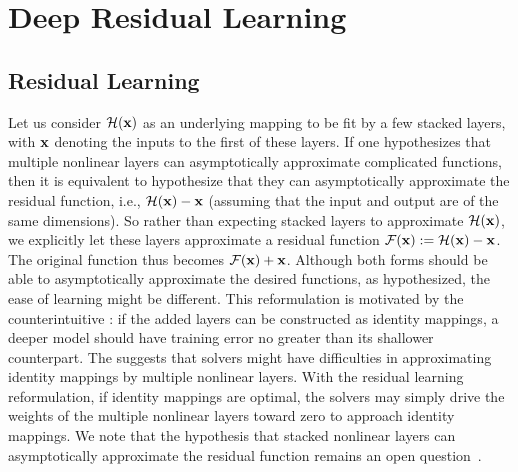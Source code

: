 \section{Deep Residual Learning}
\label{sec:method}

\subsection{Residual Learning}
\label{sec:residual}
Let us consider $\mathcal{H}(\mathbf{x})$ as an underlying mapping to be fit by a few
stacked layers, with $\mathbf{x}$ denoting the inputs to the first of these
layers. If one hypothesizes that multiple nonlinear layers can asymptotically
approximate complicated functions, then it is equivalent to hypothesize that
they can asymptotically approximate the residual function, i.e.,
$\mathcal{H}(\mathbf{x}) - \mathbf{x}$ (assuming that the input and output are of the same
dimensions). So rather than expecting stacked layers to approximate
$\mathcal{H}(\mathbf{x})$, we explicitly let these layers approximate a residual function
$\mathcal{F}(\mathbf{x}) := \mathcal{H}(\mathbf{x}) - \mathbf{x}$. The original function thus becomes
$\mathcal{F}(\mathbf{x}) + \mathbf{x}$. Although both forms should be able to asymptotically
approximate the desired functions, as hypothesized, the ease of learning might
be different. This reformulation is motivated by the counterintuitive
\degrad{}: if the added layers can be constructed as identity mappings, a deeper
model should have training error no greater than its shallower counterpart. The
\degrad{} suggests that solvers might have difficulties in approximating
identity mappings by multiple nonlinear layers. With the residual learning
reformulation, if identity mappings are optimal, the solvers may simply drive
the weights of the multiple nonlinear layers toward zero to approach identity
mappings. We note that the hypothesis that stacked nonlinear layers can
asymptotically approximate the residual function remains an open
question~\cite{montufar2014}.

